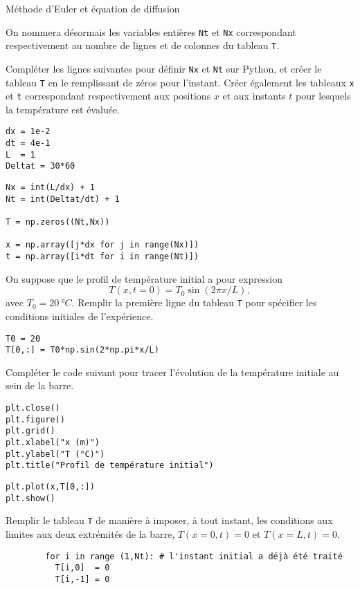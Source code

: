 \begin{exo}[1][python]{Méthode d'Euler et équation de diffusion}
\begin{questions}
      On nommera désormais les variables entières \texttt{Nt} et \texttt{Nx} correspondant respectivement au nombre de lignes  et de colonnes du tableau \texttt{T}.
      
      Compléter les lignes suivantes pour définir \texttt{Nx} et \texttt{Nt} sur Python, et créer le tableau \texttt{T} en le remplissant de zéros pour l'instant. Créer également les tableaux \texttt{x} et \texttt{t} correspondant respectivement aux positions $x$ et aux instants $t$ pour lesquels la température est évaluée.
\begin{verbatim}
dx = 1e-2
dt = 4e-1
L  = 1
Deltat = 30*60
\end{verbatim}
\begin{verbatim}
Nx = int(L/dx) + 1
Nt = int(Deltat/dt) + 1

T = np.zeros((Nt,Nx))

x = np.array([j*dx for j in range(Nx)])
t = np.array([i*dt for i in range(Nt)])
\end{verbatim}
    \item On suppose que le profil de température initial a pour expression 
    $$
    T(x,t=0) = T_0 \sin (2\pi x/L),
    $$
    avec $T_0 = \SI{20}{\degree C}$. Remplir la première ligne du tableau \texttt{T} pour spécifier les conditions initiales de l'expérience.
\begin{verbatim}
T0 = 20
T[0,:] = T0*np.sin(2*np.pi*x/L)
\end{verbatim}
    \item Compléter le code suivant pour tracer l'évolution de la température initiale au sein de la barre.
\begin{verbatim}
plt.close()
plt.figure()
plt.grid()
plt.xlabel("x (m)")
plt.ylabel("T (°C)")
plt.title("Profil de température initial")
\end{verbatim}
\begin{verbatim}
plt.plot(x,T[0,:])
plt.show()
\end{verbatim}
    \end{questions}
    
    
    \begin{questions}
      \item	
      Remplir le tableau \texttt{T} de manière à imposer, à tout instant, les conditions aux limites aux deux extrémités de la barre, $T(x=0,t)=0$ et $T(x=L,t)=0$.
        \begin{verbatim}
        for i in range (1,Nt): # l'instant initial a déjà été traité
          T[i,0]  = 0
          T[i,-1] = 0
        \end{verbatim}
      \end{questions}
      

\end{exo}
